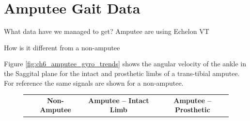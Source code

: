 \section{Amputee Gait Data}
What data have we managed to get? Amputee are using Echelon VT

How is it different from a non-amputee

Figure \ref{fig:ch6_amputee_gyro_trends} shows the angular velocity of the ankle in the Saggital plane for the intact and prosthetic limbs of a trans-tibial amputee. For reference the same signals are shown for a non-amputee.
\begin{figure}[p]
    \begin{tabular}{lccc}
        & \textbf{Non-Amputee} & \textbf{Amputee -- Intact Limb} & \textbf{Amputee -- Prosthetic} \vspace{0.2cm}\\


\end{tabular}
\end{figure}
